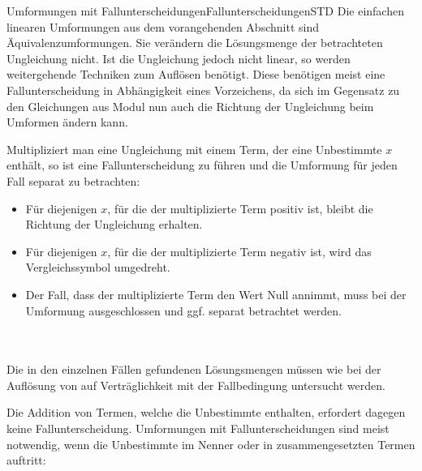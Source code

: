 \begin{MXContent}{Umformungen mit Fallunterscheidungen}{Fallunterscheidungen}{STD}
Die einfachen linearen Umformungen aus dem vorangehenden Abschnitt sind Äquivalenzumformungen. Sie verändern die Lösungsmenge der betrachteten Ungleichung nicht.
Ist die Ungleichung jedoch nicht linear, so werden weitergehende Techniken zum Auflösen benötigt. Diese benötigen meist eine Fallunterscheidung in Abhängigkeit eines Vorzeichens,
da sich im Gegensatz zu den Gleichungen aus Modul  nun auch die Richtung der Ungleichung beim Umformen ändern kann.
 
\begin{MInfo}
Multipliziert man eine Ungleichung mit einem Term, der eine Unbestimmte $x$ enthält, so ist eine Fallunterscheidung zu führen und die Umformung für jeden Fall separat zu betrachten:
\begin{itemize}
\item{Für diejenigen $x$, für die der multiplizierte Term positiv ist, bleibt die Richtung der Ungleichung erhalten.}
\item{Für diejenigen $x$, für die der multiplizierte Term negativ ist, wird das Vergleichssymbol umgedreht.}
\item{Der Fall, dass der multiplizierte Term den Wert Null annimmt, muss bei der Umformung ausgeschlossen und ggf. separat betrachtet werden.}
\end{itemize}
\ \\ \ \\
Die in den einzelnen Fällen gefundenen Lösungsmengen müssen wie bei der Auflösung von  auf Verträglichkeit mit der Fallbedingung untersucht werden.
\end{MInfo}

Die Addition von Termen, welche die Unbestimmte enthalten, erfordert dagegen keine Fallunterscheidung.
Umformungen mit Fallunterscheidungen sind meist notwendig, wenn die Unbestimmte im Nenner oder in zusammengesetzten Termen auftritt:


\end{MXContent}
